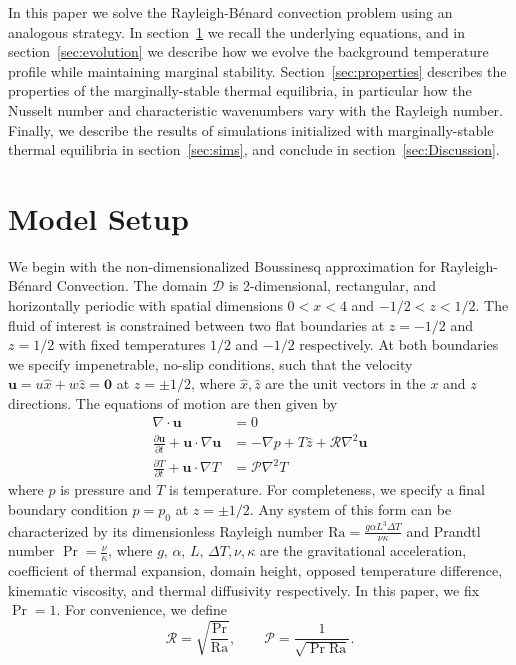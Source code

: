 \documentclass[reprint,amsmath,amssymb,aps]{revtex4-1}
\newcommand\Ra{\mathrm{Ra}}
\renewcommand{\vec}[1]{\boldsymbol{#1}}
\begin{document}
In this paper we solve the Rayleigh-B\'{e}nard convection problem using an analogous strategy.
In section~\ref{sec:model} we recall the underlying equations, and in section~\ref{sec:evolution} we describe how we evolve the background temperature profile while maintaining marginal stability.
Section~\ref{sec:properties} describes the properties of the marginally-stable thermal equilibria, in particular how the Nusselt number and characteristic wavenumbers vary with the Rayleigh number.
Finally, we describe the results of simulations initialized with marginally-stable thermal equilibria in section~\ref{sec:sims}, and conclude in section~\ref{sec:Discussion}.
 
\section{Model Setup}\label{sec:model}
We begin with the non-dimensionalized Boussinesq approximation for Rayleigh-Bénard Convection. 
The domain $\mathcal{D}$ is 2-dimensional, rectangular, and horizontally periodic with spatial dimensions $0 < x < 4$ and $-1/2 < z < 1/2$. 
The fluid of interest is constrained between two flat boundaries at $z = -1/2$ and $z = 1/2$ with fixed temperatures $1/2$ and $-1/2$ respectively. 
At both boundaries we specify impenetrable, no-slip conditions, such that the velocity $\vec{u} = u \hat{x} + w \hat{z} = \vec{0}$ at $z = \pm 1/2$, where $\hat{x}, \hat{z}$ are the unit vectors in the $x$ and $z$ directions. 
The equations of motion are then given by
\begin{align}
    \nabla \cdot \vec{u} &= 0 \label{EQ:motion1}\\
    \frac{\partial \vec{u}}{\partial t} + \vec{u} \cdot \nabla \vec{u} &= - \nabla p + T \hat{z} + \mathcal{R} \nabla^2 \vec{u} \label{EQ:motion2}\\
    \frac{\partial T}{\partial t} + \vec{u} \cdot \nabla T &= \mathcal{P} \nabla^2 T \label{EQ:motion3}
\end{align}
where $p$ is pressure and $T$ is temperature. 
For completeness, we specify a final boundary condition $p = p_0$ at $z = \pm 1/2$. 
Any system of this form can be characterized by its dimensionless Rayleigh number $\Ra = \frac{g\alpha L^3 \Delta T}{\nu \kappa}$ and Prandtl number $\Pr = \frac{\nu}{\kappa}$, where $g, \, \alpha, \, L, \, \Delta T, \nu, \kappa$ are the gravitational acceleration, coefficient of thermal expansion, domain height, opposed temperature difference, kinematic viscosity, and thermal diffusivity respectively. 
In this paper, we fix $\Pr = 1$.
For convenience, we define
\begin{equation}
\mathcal{R} = \sqrt{\frac{\Pr}{\Ra}}, \qquad \mathcal{P} = \frac{1}{\sqrt{\Pr \Ra}}.
\end{equation}
\end{document}
